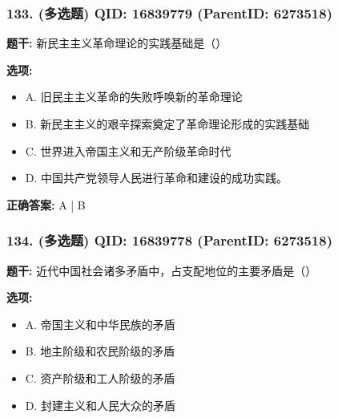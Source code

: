 \documentclass[12pt,UTF8]{ctexart}
\begin{document}
\vspace{0.3em}\hrulefill\vspace{0.7em}

\subsubsection*{133. (多选题) \small QID: 16839779 (ParentID: 6273518)}

\textbf{题干:}
新民主主义革命理论的实践基础是（）



\textbf{选项:}
\begin{itemize}[leftmargin=*]

  \item A. 旧民主主义革命的失败呼唤新的革命理论

  \item B. 新民主主义的艰辛探索奠定了革命理论形成的实践基础

  \item C. 世界进入帝国主义和无产阶级革命时代

  \item D. 中国共产党领导人民进行革命和建设的成功实践。

\end{itemize}

\textbf{正确答案:}
A | B

\vspace{0.3em}\hrulefill\vspace{0.7em}

\subsubsection*{134. (多选题) \small QID: 16839778 (ParentID: 6273518)}

\textbf{题干:}
近代中国社会诸多矛盾中，占支配地位的主要矛盾是（）



\textbf{选项:}
\begin{itemize}[leftmargin=*]

  \item A. 帝国主义和中华民族的矛盾

  \item B. 地主阶级和农民阶级的矛盾

  \item C. 资产阶级和工人阶级的矛盾

  \item D. 封建主义和人民大众的矛盾

\end{itemize}
\end{document}
